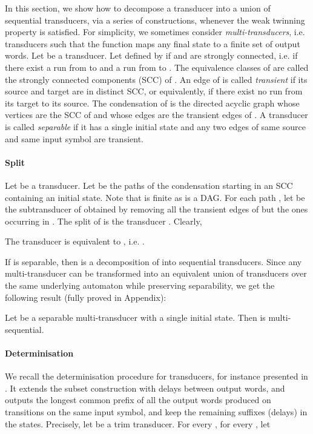 \documentclass[envcountsame]{llncs}
\begin{document}
In this section, we show how to decompose a transducer into a union of
sequential transducers, via a series of constructions, whenever the weak twinning property is
satisfied. For simplicity, we sometimes consider \emph{multi-transducers},
i.e. transducers such that the function  maps any final state to
a finite set of output words. Let  be a transducer.
Let  defined by  if  and 
are strongly connected, i.e. if there exist a run from  to  and a run from  to .
The equivalence classes of  are called the strongly connected
components (SCC) of . An edge of  is called \emph{transient} if its source and 
target are in distinct SCC, or equivalently, if there exist no run from its target to its source.
The condensation of  is the directed acyclic graph  whose vertices are the SCC of  and whose edges are the transient edges of .
A transducer is called \emph{separable} if it has a single initial
state and any two edges of same source and same input symbol are
transient.


\paragraph{\textbf{Split}} Let  be a transducer. Let  be the paths of the condensation  starting in an SCC containing an initial state. Note that  is finite as  is a DAG.
For each path , let  be the subtransducer of 
obtained by removing all the transient edges of  but the ones
occurring in . The split of  is the transducer
. Clearly,

\begin{lemma}\label{split_eq}
The transducer  is equivalent to ,
i.e. . 
\end{lemma}



If  is separable, then  is a decomposition
of  into sequential transducers. Since any multi-transducer can
be transformed into an equivalent union of transducers over the same
underlying automaton while preserving separability, we get the
following result (fully proved in Appendix):


\begin{lemma}\label{sepmultiseq}
Let  be a separable multi-transducer with a single initial state.
Then  is multi-sequential. 
\end{lemma}

\paragraph{\textbf{Determinisation}} We recall the determinisation
procedure for transducers, for instance presented in 
\cite{DBLP:journals/tcs/BealC02}. It extends the subset construction
with delays between output words, and outputs the longest common
prefix of all the output words produced on transitions on the same input
symbol, and keep the remaining suffixes (delays) in the states. 
Precisely, let  be a trim transducer. For every , for every , let 
\end{document}
